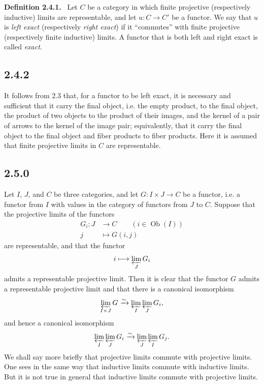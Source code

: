 \documentclass[11pt]{article}
\newcommand{\Ob}{\operatorname{Ob}}
\newenvironment{statement}[1]{\par\medskip\noindent\textbf{#1.}\ }{\par\medskip}
\begin{document}
\begin{statement}{Definition 2.4.1}
Let $C$ be a category in which finite projective (respectively inductive) limits are representable, and let $u:C\to C'$ be a functor. We say that $u$ is \emph{left exact} (respectively \emph{right exact}) if it ``commutes'' with finite projective (respectively finite inductive) limits. A functor that is both left and right exact is called \emph{exact}.
\end{statement}

\subsection*{2.4.2}
It follows from 2.3 that, for a functor to be left exact, it is necessary and sufficient that it carry the final object, i.e. the empty product, to the final object, the product of two objects to the product of their images, and the kernel of a pair of arrows to the kernel of the image pair; equivalently, that it carry the final object to the final object and fiber products to fiber products. Here it is assumed that finite projective limits in $C$ are representable.

\subsection*{2.5.0}
Let $I$, $J$, and $C$ be three categories, and let $G:I\times J\to C$ be a functor, i.e. a functor from $I$ with values in the category of functors from $J$ to $C$. Suppose that the projective limits of the functors
\begin{align*}
G_i:J&\longrightarrow C\qquad (i\in\Ob(I))\\
j&\longmapsto G(i,j)
\end{align*}
are representable, and that the functor
\[
i\longmapsto \varprojlim_J G_i
\]
admits a representable projective limit. Then it is clear that the functor $G$ admits a representable projective limit and that there is a canonical isomorphism
\[
\varprojlim_{I\times J}G\xrightarrow{\sim}\varprojlim_I\varprojlim_J G_i,
\]
and hence a canonical isomorphism
\[
\varprojlim_I\varprojlim_JG_i\xrightarrow{\sim}\varprojlim_J\varprojlim_I G_j.
\]
We shall say more briefly that projective limits commute with projective limits. One sees in the same way that inductive limits commute with inductive limits. But it is not true in general that inductive limits commute with projective limits.
\end{document}
